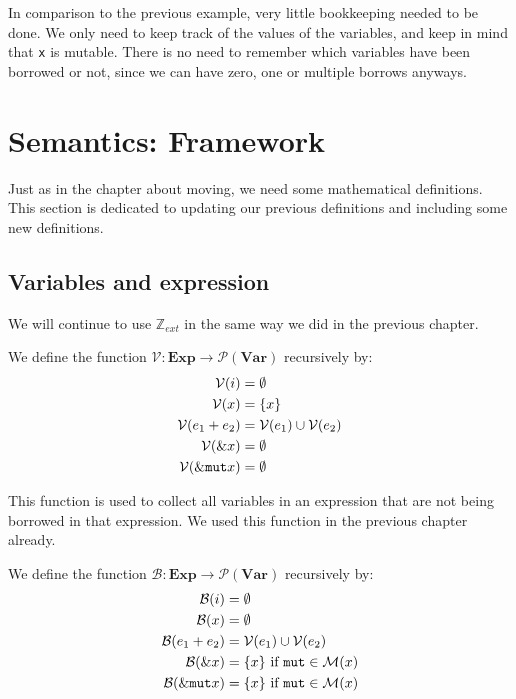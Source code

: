 In comparison to the previous example, very little bookkeeping needed to be done. We only need to keep track of the values of the variables, and keep in mind that \texttt{x} is mutable. There is no need to remember which variables have been borrowed or not, since we can have zero, one or multiple borrows anyways. 

\section{Semantics: Framework}
Just as in the chapter about moving, we need some mathematical definitions. This section is dedicated to updating our previous definitions and including some new definitions. 

\subsection*{Variables and expression}
We will continue to use $\mathbb{Z}_{ext}$ in the same way we did in the previous chapter. 

\begin{definition}
We define the function $\mathcal{V}: \textbf{Exp} \to \mathcal{P}(\textbf{Var})$ recursively by:
\begin{align*}
    \mathcal{V}(i)          &= \emptyset
\\  \mathcal{V}(x)          &= \{ x \}
\\  \mathcal{V}(e_1 + e_2)  &= \mathcal{V}(e_1) \cup \mathcal{V}(e_2)
\\  \mathcal{V}(\& x)       &= \emptyset
\\  \mathcal{V}(\& \texttt{mut} x)  &= \emptyset
\end{align*}
\end{definition}

This function is used to collect all variables in an expression that are not being borrowed in that expression. We used this function in the previous chapter already. 

\begin{definition}
We define the function $\mathcal{B}: \textbf{Exp} \to \mathcal{P}(\textbf{Var})$ recursively by:
\begin{align*}
    \mathcal{B}(i)          &= \emptyset
\\  \mathcal{B}(x)          &= \emptyset
\\  \mathcal{B}(e_1 + e_2)  &= \mathcal{V}(e_1) \cup \mathcal{V}(e_2)
\\  \mathcal{B}(\& x)       &= \{ x \} \textrm{ if } \texttt{mut} \in \mathcal{M}(x) 
\\  \mathcal{B}(\& \texttt{mut} x)  &= \{ x \} \textrm{ if } \texttt{mut} \in \mathcal{M}(x) 
\end{align*}
\end{definition}

